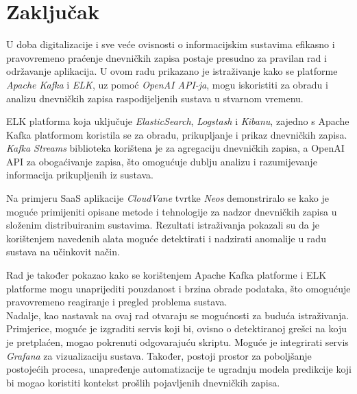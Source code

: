 \documentclass[times, utf8, diplomski]{fer}
\begin{document}
\chapter{Zaključak}
\label{sec:conclusion}

U doba digitalizacije i sve veće ovisnosti o informacijskim sustavima efikasno i pravovremeno praćenje dnevničkih zapisa postaje presudno za pravilan rad i održavanje aplikacija. U ovom radu prikazano je istraživanje kako se platforme \emph{Apache Kafka} i \emph{ELK}, uz pomoć \emph{OpenAI API-ja}, mogu iskoristiti za obradu i analizu dnevničkih zapisa raspodijeljenih sustava u stvarnom vremenu.

ELK platforma koja uključuje \emph{ElasticSearch}, \emph{Logstash} i \emph{Kibanu}, zajedno s Apache Kafka platformom koristila se za obradu, prikupljanje i prikaz dnevničkih zapisa. \emph{Kafka Streams} biblioteka korištena je za agregaciju dnevničkih zapisa, a OpenAI API za obogaćivanje zapisa, što omogućuje dublju analizu i razumijevanje informacija prikupljenih iz sustava.

Na primjeru SaaS aplikacije \emph{CloudVane} tvrtke \emph{Neos} demonstriralo se kako je moguće primijeniti opisane metode i tehnologije za nadzor dnevničkih zapisa u složenim distribuiranim sustavima. Rezultati istraživanja pokazali su da je korištenjem navedenih alata moguće detektirati i nadzirati anomalije u radu sustava na učinkovit način.

Rad je također pokazao kako se korištenjem Apache Kafka platforme i ELK platforme mogu unaprijediti pouzdanost i brzina obrade podataka, što omogućuje pravovremeno reagiranje i pregled problema sustava.\\

Nadalje, kao nastavak na ovaj rad otvaraju se mogućnosti za buduća istraživanja. Primjerice, moguće je izgraditi servis koji bi, ovisno o detektiranoj grešci na koju je pretplaćen, mogao pokrenuti odgovarajuću skriptu. Moguće je integrirati servis \emph{Grafana} za vizualizaciju sustava. Također, postoji prostor za poboljšanje postojećih procesa, unapređenje automatizacije te ugradnju modela predikcije koji bi mogao koristiti kontekst prošlih pojavljenih dnevničkih zapisa.





\end{document}
